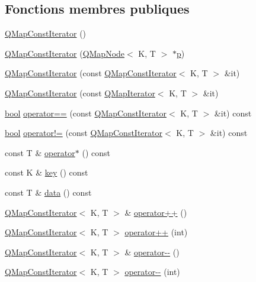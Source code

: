 \subsection*{Fonctions membres publiques}
\begin{DoxyCompactItemize}
\item 
\hyperlink{class_q_map_const_iterator_a86b9986fefaa47f9991d997993074309}{Q\+Map\+Const\+Iterator} ()
\item 
\hyperlink{class_q_map_const_iterator_a7e14b5e794324934f2764ac6677384c4}{Q\+Map\+Const\+Iterator} (\hyperlink{struct_q_map_node}{Q\+Map\+Node}$<$ K, T $>$ $\ast$\hyperlink{060__command__switch_8tcl_a15229b450f26d8fa1c10bea4f3279f4d}{p})
\item 
\hyperlink{class_q_map_const_iterator_a2c335bfdb9ac4b7e0f18d268c2f5b47c}{Q\+Map\+Const\+Iterator} (const \hyperlink{class_q_map_const_iterator}{Q\+Map\+Const\+Iterator}$<$ K, T $>$ \&it)
\item 
\hyperlink{class_q_map_const_iterator_a9b3a6f2a8a27f95e40b84741c3e276b0}{Q\+Map\+Const\+Iterator} (const \hyperlink{class_q_map_iterator}{Q\+Map\+Iterator}$<$ K, T $>$ \&it)
\item 
\hyperlink{qglobal_8h_a1062901a7428fdd9c7f180f5e01ea056}{bool} \hyperlink{class_q_map_const_iterator_a26a11e7ad281860ff1b1e183cdf0fe98}{operator==} (const \hyperlink{class_q_map_const_iterator}{Q\+Map\+Const\+Iterator}$<$ K, T $>$ \&it) const 
\item 
\hyperlink{qglobal_8h_a1062901a7428fdd9c7f180f5e01ea056}{bool} \hyperlink{class_q_map_const_iterator_a278aa8840f75fb9815b10128e1c46653}{operator!=} (const \hyperlink{class_q_map_const_iterator}{Q\+Map\+Const\+Iterator}$<$ K, T $>$ \&it) const 
\item 
const T \& \hyperlink{class_q_map_const_iterator_a9daadab4dfe09248924b814d85c88641}{operator$\ast$} () const 
\item 
const K \& \hyperlink{class_q_map_const_iterator_aebcf1df117eacd081ff88c2d21248cc4}{key} () const 
\item 
const T \& \hyperlink{class_q_map_const_iterator_a43f67fd8d60067e3dd55d66a03614841}{data} () const 
\item 
\hyperlink{class_q_map_const_iterator}{Q\+Map\+Const\+Iterator}$<$ K, T $>$ \& \hyperlink{class_q_map_const_iterator_ae9b0b32cee40c960eb72be4b3fc12d2a}{operator++} ()
\item 
\hyperlink{class_q_map_const_iterator}{Q\+Map\+Const\+Iterator}$<$ K, T $>$ \hyperlink{class_q_map_const_iterator_a5da8218d8c61693ebc1681b6843a1fc0}{operator++} (int)
\item 
\hyperlink{class_q_map_const_iterator}{Q\+Map\+Const\+Iterator}$<$ K, T $>$ \& \hyperlink{class_q_map_const_iterator_a632cc449def35c955abbd93b30570f92}{operator-\/-\/} ()
\item 
\hyperlink{class_q_map_const_iterator}{Q\+Map\+Const\+Iterator}$<$ K, T $>$ \hyperlink{class_q_map_const_iterator_a6f2985c16785befa482d322d80caa55e}{operator-\/-\/} (int)
\end{DoxyCompactItemize}
